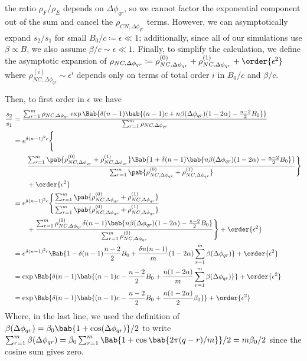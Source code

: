 the ratio $\rho_F/\rho_E$ depends on $\Delta \phi_{qr}$,
so we cannot factor the exponential component out of the sum
and cancel the $\rho_{CN,\Delta \phi_{qr}}$ terms.
However, we can asymptotically expand $s_2/s_1$ for small
$B_0/c \coloneqq \epsilon \ll 1$;
additionally, since all of our simulations use $\beta \propto B$,
we also assume $\beta/c \sim \epsilon \ll 1$.
Finally, to simplify the calculation,
we define the asymptotic expansion of
$\rho_{NC,\Delta \phi_{qr}} \coloneqq
\rho_{NC,\Delta \phi_{qr}}^{(0)}
+
\rho_{NC,\Delta \phi_{qr}}^{(1)}
+
\order{\epsilon^2}
$
where
$
\rho_{NC,\Delta \phi_{qr}}^{(i)} \sim \epsilon^i
$
depends only on terms of total order $i$ in $B_0/c$ and $\beta/c$.

Then, to first order in $\epsilon$
we have
\begin{align*}
  \frac{s_2}{s_1}
  &=
  \frac
  {\sum_{r=1}^{m} \rho_{NC,\Delta \phi_{qr}}
    \exp \Bab{
      \delta (n-1)
      \bab{
        (n-1) c + n \beta(\Delta \phi_{qr}) (1 - 2 \alpha)
        - \frac{n-2}{2} B_0
      }
    }
  }
  {\sum_{r=1}^{m} \rho_{NC,\Delta \phi_{qr}}}
  \\
  &=
  e^{\delta (n-1)^2 c}
  \Biggl\{
  \\
  &\qquad
  \frac
  {\sum_{r=1}^{m}
    \pab{
      \rho_{NC,\Delta \phi_{qr}}^{(0)}
      +
      \rho_{NC,\Delta \phi_{qr}}^{(1)}
    }
    \Bab{1 +
      \delta (n-1)
      \bab{
        n \beta(\Delta \phi_{qr}) (1 - 2 \alpha)
        - \frac{n-2}{2} B_0
      }
    }
  }
  {\sum_{r=1}^{m} \pab{
    \rho_{NC,\Delta \phi_{qr}}^{(0)}
    +
    \rho_{NC,\Delta \phi_{qr}}^{(1)}
  }}
  \Biggr\}
  \\
  &\qquad
  + \order{\epsilon^2}
  \\
  &=
  e^{\delta (n-1)^2 c}
  \Biggl\{
  \frac
  {\sum_{r=1}^{m}
    \pab{
      \rho_{NC,\Delta \phi_{qr}}^{(0)}
      +
      \rho_{NC,\Delta \phi_{qr}}^{(1)}
    }
  }
  {\sum_{r=1}^{m} \pab{
    \rho_{NC,\Delta \phi_{qr}}^{(0)}
    +
    \rho_{NC,\Delta \phi_{qr}}^{(1)}
  }}
  \\
  &\qquad
  +
  \frac
  {\sum_{r=1}^{m} \rho_{NC,\Delta \phi_{qr}}^{(0)}
    \delta (n-1)
    \bab{
      n \beta(\Delta \phi_{qr}) (1 - 2 \alpha)
      - \frac{n-2}{2} B_0
    }
  }
  {\sum_{r=1}^{m} \rho_{NC,\Delta \phi_{qr}}^{(0)}
  }
  \Biggr\}
  + \order{\epsilon^2}
  \\
  &=
  e^{\delta (n-1)^2 c}
  \Bab{
    1
    - \delta (n-1) \frac{n-2}{2} B_0
    +
    \frac{\delta n (n-1)}{m} (1 - 2 \alpha)
    \sum_{r=1}^{m} \beta(\Delta \phi_{qr})
  }
  + \order{\epsilon^2}
  \\
  &=
  \exp \Bab{\delta (n-1) \bab{
    (n-1) c
    - \frac{n-2}{2} B_0
    +
    \frac{n (1 - 2 \alpha)}{m}
    \sum_{r=1}^{m} \beta(\Delta \phi_{qr})
  }}
  + \order{\epsilon^2}
  \\
  &=
  \exp \Bab{ \delta (n-1) \bab{
    (n-1) c
    - \frac{n-2}{2} B_0
    +
    \frac{n (1 - 2 \alpha)}{2} \beta_0
  }}
  + \order{\epsilon^2}
\end{align*}
Where, in the last line, we used
the definition of
$\beta(\Delta \phi_{qr}) = \beta_0 \bab{1 + \cos(\Delta \phi_{qr})}/2$
to write
$\sum_{r=1}^m \beta(\Delta \phi_{qr})
= \beta_0 \sum_{r=1}^m \Bab{1 + \cos\bab{2 \pi (q-r)/m}}/2
= m \beta_0/2$
since the cosine sum gives zero.


